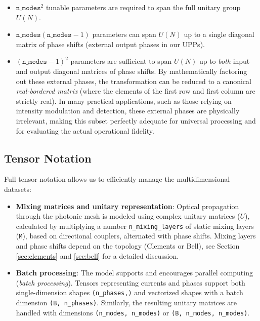 \documentclass[11pt, a4paper]{article}
\begin{document}
\begin{itemize}
    \item $\texttt{n\_modes}^2$ tunable parameters are required to span the full unitary group $U(N)$.
    \item $\texttt{n\_modes}(\texttt{n\_modes}-1)$ parameters can span $U(N)$ up to a single diagonal matrix of phase shifts (external output phases in our UPPs).
    \item $(\texttt{n\_modes}-1)^2$ parameters are sufficient to span $U(N)$ up to \textit{both} input and output diagonal matrices of phase shifts. By mathematically factoring out these external phases, the transformation can be reduced to a canonical \textit{real-bordered matrix} (where the elements of the first row and first column are strictly real). In many practical applications, such as those relying on intensity modulation and detection, these external phases are physically irrelevant, making this subset perfectly adequate for universal processing and for evaluating the actual operational fidelity.
\end{itemize}


\subsection{Tensor Notation}
Full tensor notation allows us to efficiently manage the multidimensional datasets:
\begin{itemize}
    \item \textbf{Mixing matrices and unitary representation}: Optical propagation through the photonic mesh is modeled using complex unitary matrices ($U$), calculated by multiplying a number \texttt{n\_mixing\_layers} of static mixing layers (\texttt{M}), based on directional couplers, alternated with phase shifts. Mixing layers and phase shifts depend on the topology (Clements or Bell), see Section \ref{sec:clements} and \ref{sec:bell} for a detailed discussion.
    \item \textbf{Batch processing}: The model supports and encourages parallel computing (\textit{batch processing}). Tensors representing currents and phases support both single-dimension shapes \texttt{(n\_phases,)} and vectorized shapes with a batch dimension \texttt{(B, n\_phases)}. Similarly, the resulting unitary matrices are handled with dimensions \texttt{(n\_modes, n\_modes)} or \texttt{(B, n\_modes, n\_modes)}.
\end{itemize}
\end{document}
